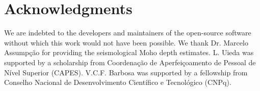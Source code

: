 \documentclass[extra,mreferee]{gji}
\begin{document}
\section{Acknowledgments}

We are indebted to the developers and maintainers of the open-source
software without which this work would not have been possible.
We thank Dr. Marcelo Assumpção for providing the seismological Moho depth
estimates.
L. Uieda was supported by a scholarship from
Coordenação de Aperfeiçoamento de Pessoal de Nível Superior
(CAPES).
V.C.F. Barbosa was supported by a fellowship from
Conselho Nacional de Desenvolvimento Científico e Tecnológico (CNPq).




\end{document}
